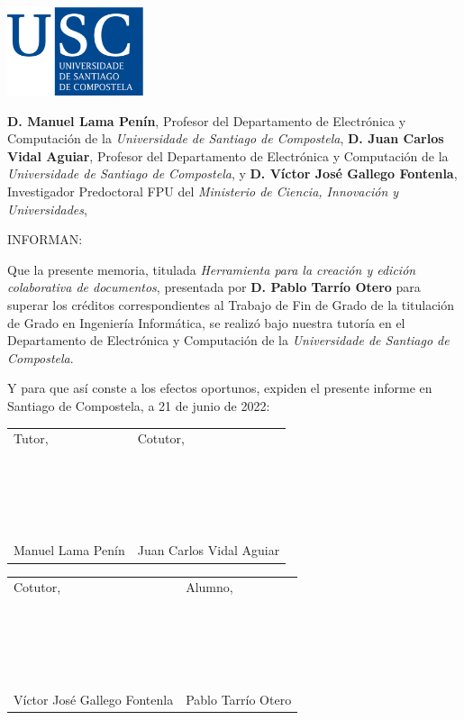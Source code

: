 \pagestyle{plain}
\includegraphics[width=4cm]{figuras/logo_usc.eps}

\vspace{1cm}
{\bf D. Manuel Lama Penín}, Profesor del Departamento de Electrónica y Computación de la {\it Universidade de Santiago de Compostela}, {\bf D. Juan Carlos Vidal Aguiar}, Profesor del Departamento de Electrónica y Computación de la {\it Universidade de Santiago de Compostela}, y {\bf D. Víctor José Gallego Fontenla}, Investigador Predoctoral FPU del {\it Ministerio de Ciencia, Innovación y Universidades},

\vspace{1cm}
INFORMAN:

\vspace{1cm}
Que la presente memoria, titulada {\it Herramienta para la creación y edición
colaborativa de documentos}, presentada por {\bf D. Pablo Tarrío Otero} para superar los créditos correspondientes al Trabajo de Fin de Grado de la titulación de Grado en Ingeniería Informática, se realizó bajo nuestra tutoría en el Departamento de Electrónica y Computación de la {\it Universidade de Santiago de Compostela}.

\vspace{1cm}
Y para que así conste a los efectos oportunos, expiden el presente informe en Santiago de Compostela, a 21 de junio de 2022:

\vspace{0.5cm}
\begin{tabular}{ll}
	Tutor, & \hspace{3.6cm} Cotutor, \\
	~ \\
	~ \\
	~ \\
	~ \\
	Manuel Lama Penín & \hspace{3.6cm} Juan Carlos Vidal Aguiar
\end{tabular}

\vspace{1cm}
\begin{tabular}{ll}
	Cotutor, & \hspace{2cm} Alumno, \\
	~ \\
	~ \\
	~ \\
	~ \\
	Víctor José Gallego Fontenla & \hspace{2cm} Pablo Tarrío Otero
\end{tabular}

